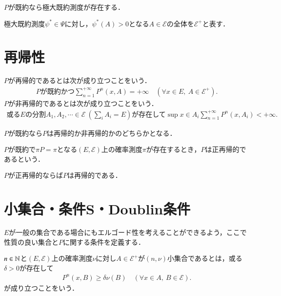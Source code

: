 	\begin{prp}[極大既約測度の存在]
		$P$が既約なら極大既約測度が存在する．
	\end{prp}
	
	極大既約測度$\psi^* \in \Psi$に対し，$\psi^*(A) > 0$となる$A \in \mathcal{E}$の全体を$\mathcal{E}^+$と表す．

\section{再帰性}
	\begin{dfn}[再帰性]
		$P$が再帰的であるとは次が成り立つことをいう．
		\begin{align}
			\mbox{$P$が既約かつ} \sum_{n=1}^{+\infty} P^n(x,A) = +\infty \quad (\forall x \in E,\ A \in \mathcal{E}^+).
		\end{align}
		$P$が非再帰的であるとは次が成り立つことをいう．
		\begin{align}
			\mbox{或る$E$の分割$A_1,A_2,\cdots \in \mathcal{E}\ (\sum_{i}A_i = E)$が存在して} \sup{x \in A_i} \sum_{n=1}^{+\infty} P^n(x,A_i) < +\infty.
		\end{align}
	\end{dfn}
	
	\begin{prp}
		$P$が既約なら$P$は再帰的か非再帰的かのどちらかとなる．
	\end{prp}
	
	\begin{dfn}[正再帰性]
		 $P$が既約で$ \pi P = \pi$となる$(E,\mathcal{E})$上の確率測度$\pi$が存在するとき，$P$は正再帰的であるという．
	\end{dfn}
	
	\begin{prp}
		$P$が正再帰的ならば$P$は再帰的である．
	\end{prp}
	
\section{小集合・条件S・Doublin条件}
	$E$が一般の集合である場合にもエルゴード性を考えることができるよう，ここで性質の良い集合と$P$に関する条件を定義する．
	
	\begin{dfn}[小集合]
		$n \in \mathbb{N}$と$(E,\mathcal{E})$上の確率測度$\nu$に対し$A \in \mathcal{E}^+$が$(n,\nu)$小集合であるとは，或る$\delta > 0$が存在して
		\begin{align}
			P^n(x,B) \geq \delta \nu(B) \quad (\forall x \in A,\ B \in \mathcal{E}).
		\end{align}
		が成り立つことをいう．
	\end{dfn}
	
